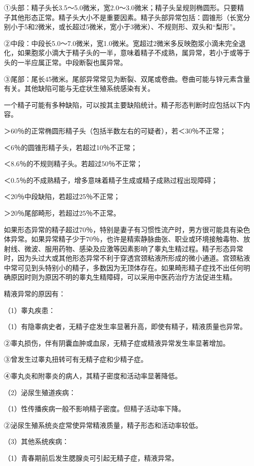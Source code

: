 \documentclass[12pt,UTF8]{ctexbook}
\begin{document}
①头部：精子头长3.5～5.0微米，宽2.0～3.0微米；精子头呈规则椭圆形。只要精子其他形态正常。精子头大小不是重要因素。精子头部异常包括：圆锥形（长宽分别小于5和2微米，或长超过5微米，宽小于3微米）、不规则形、双头和“梨形”。

②中段：中段长5.0～7.0微米，宽1.0微米。宽超过2微米多反映胞浆小滴未完全退化，如果胞浆小滴大于精子头的一半，意味着精子不成熟，属异常，若小于或等于头的一半应属正常。中段断裂也属异常。

③尾部：尾长45微米。尾部异常常见为断裂、双尾或卷曲。卷曲可能与锌元素含量有关。其他缺陷可能与无症状生殖系统感染有关。

一个精子可能有多种缺陷，可以按其主要缺陷统计。精子形态判断时应包括以下内容。

＞60％的正常椭圆形精子头（包括半数左右的可疑者），若＜30％不正常；

＜6％的圆锥形精子头，若超过10％不正常；

＜8.6％的不规则精子头。若超过50％不正常；

＜0.5％的不成熟精子，增多意味着精子生成或精子成熟过程出现障碍；

＜20％中段缺陷，若超过25％不正常；

＞20％尾部畸形，若超过25％不正常。

如果形态异常的精子超过70％，特别是妻子有习惯性流产时，男方很可能具有染色体异常。如果异常精子少于70％，也许是精索静脉曲张、职业或环境接触毒物、放射线、微波、服用药物、感染及应激等因素影响了睾丸生精过程。精子形态异常时，因为头过大或其他形态异常不利于穿透宫颈粘液所形成的微小通道。宫颈粘液中常可见到头特别小的精子，多数因为无顶体存在。如果畸形精子症找不出任何明确原因时则为原因不明的睾丸生精障碍，可以采用中医药治疗方法促进生精。

精液异常的原因有：

（1）睾丸疾患：

（1）有隐睾病史者，无精子症发生率显著升高，即使有精子，精液质量也异常。

②睾丸损伤，伴有阴囊血肿或血尿，无精子症或精液异常发生率显著增加。

③曾发生过睾丸扭转可有无精子症和少精子症。

④睾丸炎和附睾炎的病人，其精子密度和活动率显著降低。

（2）泌尿生殖道疾病：

（1）性传播疾病一般不影响精子密度。但精子活动率下降。

②泌尿生殖系统炎症常使异常精液质量，精子形态和活动率较低。

（3）其他系统疾病：

（1）青春期前后发生腮腺炎可引起无精子症，精液异常。
\end{document}
